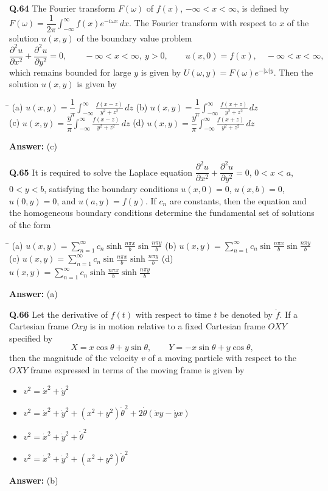 \documentclass[11pt,a4paper]{article}
\newcommand{\optsfour}[4]{%
  \begin{tabbing}
    \hspace{0.48\linewidth}\=\kill
    (a) #1 \> (b) #2 \\[2pt]
    (c) #3 \> (d) #4
  \end{tabbing}%
}
\newcommand{\optslist}[4]{%
  \begin{itemize}
    \setlength{\itemsep}{2pt}\setlength{\parskip}{0pt}
    \item[(a)] #1
    \item[(b)] #2
    \item[(c)] #3
    \item[(d)] #4
  \end{itemize}%
}
\newcommand{\ans}[1]{\textbf{Answer:} #1\par\medskip}
\begin{document}
\textbf{Q.64} The Fourier transform $F(\omega)$ of $f(x)$, $-\infty < x < \infty$, is defined by $F(\omega) = \dfrac{1}{2\pi}\displaystyle\int_{-\infty}^{\infty} f(x)e^{-i\omega x}\,dx$. The Fourier transform with respect to $x$ of the solution $u(x,y)$ of the boundary value problem
\[
  \frac{\partial^2 u}{\partial x^2} + \frac{\partial^2 u}{\partial y^2} = 0, \qquad -\infty < x < \infty,\ y > 0, \qquad u(x,0) = f(x), \quad -\infty < x < \infty,
\]
which remains bounded for large $y$ is given by $U(\omega, y) = F(\omega)e^{-|\omega|y}$. Then the solution $u(x,y)$ is given by
\optsfour{$u(x,y) = \dfrac{1}{\pi}\displaystyle\int_{-\infty}^{\infty} \frac{f(x - z)}{y^2 + z^2}\,dz$}{$u(x,y) = \dfrac{1}{\pi}\displaystyle\int_{-\infty}^{\infty} \frac{f(x + z)}{y^2 + z^2}\,dz$}{$u(x,y) = \dfrac{y}{\pi}\displaystyle\int_{-\infty}^{\infty} \frac{f(x - z)}{y^2 + z^2}\,dz$}{$u(x,y) = \dfrac{y}{\pi}\displaystyle\int_{-\infty}^{\infty} \frac{f(x + z)}{y^2 + z^2}\,dz$}
\ans{(c)}

\textbf{Q.65} It is required to solve the Laplace equation $\dfrac{\partial^2 u}{\partial x^2} + \dfrac{\partial^2 u}{\partial y^2} = 0$, $0 < x < a$, $0 < y < b$, satisfying the boundary conditions $u(x,0) = 0$, $u(x,b) = 0$, $u(0,y) = 0$, and $u(a,y) = f(y)$. If $c_n$ are constants, then the equation and the homogeneous boundary conditions determine the fundamental set of solutions of the form
\optsfour{$u(x,y) = \displaystyle\sum_{n=1}^{\infty} c_n \sinh\frac{n\pi x}{b}\sin\frac{n\pi y}{b}$}{$u(x,y) = \displaystyle\sum_{n=1}^{\infty} c_n \sin\frac{n\pi x}{b}\sin\frac{n\pi y}{b}$}{$u(x,y) = \displaystyle\sum_{n=1}^{\infty} c_n \sin\frac{n\pi x}{b}\sinh\frac{n\pi y}{b}$}{$u(x,y) = \displaystyle\sum_{n=1}^{\infty} c_n \sinh\frac{n\pi x}{b}\sinh\frac{n\pi y}{b}$}
\ans{(a)}

\textbf{Q.66} Let the derivative of $f(t)$ with respect to time $t$ be denoted by $\dot{f}$. If a Cartesian frame $Oxy$ is in motion relative to a fixed Cartesian frame $OXY$ specified by
\[
  X = x\cos\theta + y\sin\theta, \qquad Y = -x\sin\theta + y\cos\theta,
\]
then the magnitude of the velocity $v$ of a moving particle with respect to the $OXY$ frame expressed in terms of the moving frame is given by
\optslist{$v^2 = \dot{x}^2 + \dot{y}^2$}{$v^2 = \dot{x}^2 + \dot{y}^2 + (x^2 + y^2)\dot{\theta}^2 + 2\dot{\theta}(\dot{x}y - \dot{y}x)$}{$v^2 = \dot{x}^2 + \dot{y}^2 + \dot{\theta}^2$}{$v^2 = \dot{x}^2 + \dot{y}^2 + (x^2 + y^2)\dot{\theta}^2$}
\ans{(b)}
\end{document}
